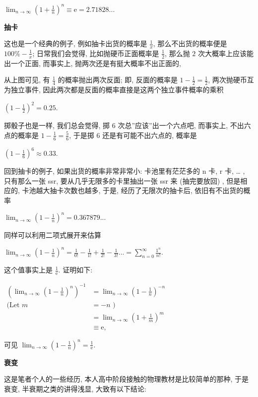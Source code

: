 \(\boxed{\lim_{n\rightarrow\infty}\left(1+\frac{1}{n}\right)^n\equiv\mathrm{e}=2.71828...}\)

\textbf{抽卡}

这也是一个经典的例子, 例如抽卡出货的概率是 \(\frac{1}{x}\),
那么不出货的概率便是 \(100\%-\frac{1}{x}\); 日常我们会觉得,
比如抛硬币正面概率是 \(\frac{1}{2}\), 那么抛 \(2\)
次大概率上应该能出一个正面, 而事实上, 抛两次还是有挺大概率不出正面的,

从上图可见, 有 \(\frac{1}{4}\) 的概率抛出两次反面; 即, 反面的概率是
\(1-\frac{1}{2}=\frac{1}{2}\), 两次抛硬币互为独立事件,
因此两次都是反面的概率直接是这两个独立事件概率的乘积

\(\left (1-\frac{1}{2}\right)^2=0.25.\)

掷骰子也是一样, 我们总会觉得, 掷 \(6\) 次总''应该''出一个六点吧,
而事实上, 不出六点的概率是 \(1-\frac{1}{6}=\frac{5}{6}\), 于是掷 \(6\)
还是有可能不出六点的, 概率是

\(\left (1-\frac{1}{6}\right)^6\approx0.33.\)

回到抽卡的例子, 如果出货的概率非常非常小: 卡池里有茫茫多的 n 卡, r 卡,
\ldots{} , 只有那么一张 ssr, 要从几乎无限多的卡里抽出一张 ssr 来
(抽完要放回) , 但是相应的, 卡池越大抽卡次数也越多, 于是,
经历了无限次的抽卡后, 依旧有不出货的概率

\(\lim_{n\rightarrow\infty}\left (1-\frac{1}{n}\right)^n=0.367879...\)

同样可以利用二项式展开来估算

\(\lim_{n\rightarrow\infty}\left (1-\frac{1}{n}\right)^n=\frac{1}{0!}-\frac{1}{1!}+\frac{1}{2!}-\frac{1}{3!}...=\sum_{n=0}^\infty\frac{1^{n}}{n!}.\)

这个值事实上是 \(\frac{1}{\mathrm{e}}\). 证明如下:

\(\begin{aligned}\left(\lim_{n\rightarrow\infty}\left (1-\frac{1}{n}\right)^n\right)^{-1}&=\lim_{n\rightarrow\infty}\left (1-\frac{1}{n}\right)^{-n}\\\text{(Let }m&=-n\text{ )}\\&=\lim_{n\rightarrow\infty}\left (1+\frac{1}{m}\right)^m\\&\equiv\mathrm{e,}\end{aligned}\)

可见
\(\boxed{\lim_{n\rightarrow\infty}\left (1-\frac{1}{n}\right)^n=\frac{1}{\mathrm{e}}}\).

\textbf{衰变}

这是笔者个人的一些经历, 本人高中阶段接触的物理教材是比较简单的那种,
于是衰变, 半衰期之类的讲得浅显, 大致有以下结论:

